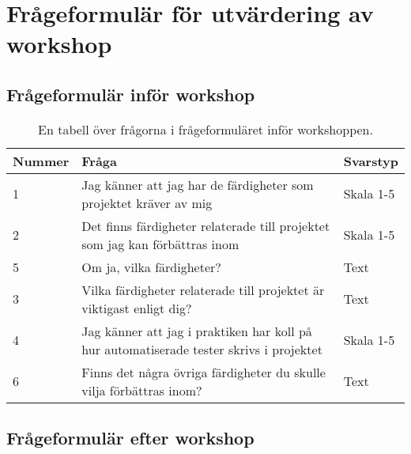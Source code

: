 \chapter{\hspace{2.6em} Frågeformulär för utvärdering av workshop}

\section{Frågeformulär inför workshop}
\label{sec:workshop_undersokning}

\begin{table}[h!]
  \centering
  \caption{En tabell över frågorna i frågeformuläret inför workshoppen.}
  \def\arraystretch{1.5}
  \begin{adjustbox}{max width=\textwidth}
    \begin{tabularx}{\textwidth}{ | l | X | l |}
      \hline
      \textbf{Nummer} & \textbf{Fråga} & \textbf{Svarstyp} \\
      \hline
      1 & Jag känner att jag har de färdigheter som projektet kräver av mig & Skala 1-5 \\
      \hline
      2 & Det finns färdigheter relaterade till projektet som jag kan förbättras inom & Skala 1-5 \\
      \hline 
      5 & Om ja, vilka färdigheter? & Text \\
      \hline
      3 & Vilka färdigheter relaterade till projektet är viktigast enligt dig? & Text \\
      \hline
      4 & Jag känner att jag i praktiken har koll på hur automatiserade tester skrivs i projektet & Skala 1-5 \\
      \hline
      6 & Finns det några övriga färdigheter du skulle vilja förbättras inom? & Text \\
      \hline
    \end{tabularx}
  \end{adjustbox}
  \label{tab:workshop_undersokning}
\end{table}

\pagebreak
\section{Frågeformulär efter workshop}
\label{sec:workshop_efter_formular}

